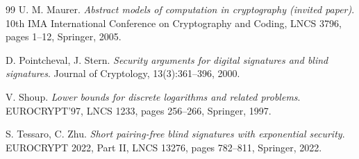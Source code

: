 \documentclass{conjura-conjecture}
\begin{document}
\begin{conjurabibliography}{99}
U. M. Maurer.
\emph{Abstract models of computation in cryptography (invited paper)}.
10th IMA International Conference on Cryptography and Coding, LNCS 3796,
pages 1--12, Springer, 2005.

D. Pointcheval, J. Stern.
\emph{Security arguments for digital signatures and blind signatures}.
Journal of Cryptology, 13(3):361--396, 2000.

V. Shoup.
\emph{Lower bounds for discrete logarithms and related problems}.
EUROCRYPT'97, LNCS 1233, pages 256--266, Springer, 1997.

S. Tessaro, C. Zhu.
\emph{Short pairing-free blind signatures with exponential security}.
EUROCRYPT 2022, Part II, LNCS 13276, pages 782--811, Springer, 2022.

\end{conjurabibliography}
\end{document}
